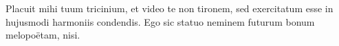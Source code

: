 \documentclass[fontsize=11pt, pagesize=false]{scrbook}
\begin{document}
  

\begin{pages}
\begin{Leftside}
\beginnumbering
\pstart
{}
\pend\pstart
Placuit mihi tuum tricinium, et video te non tironem, sed exercitatum esse in hujusmodi harmoniis condendis. Ego sic statuo neminem futurum bonum melopoëtam, nisi.
\pend
\endnumbering
\end{Leftside}


\begin{Rightside}
\beginnumberingR
\pstart
{}
\pend\pstart
\blindtext
\pend
\endnumberingR
\end{Rightside}
\end{pages}
\Pages

\printindex[persona]
\end{document}
